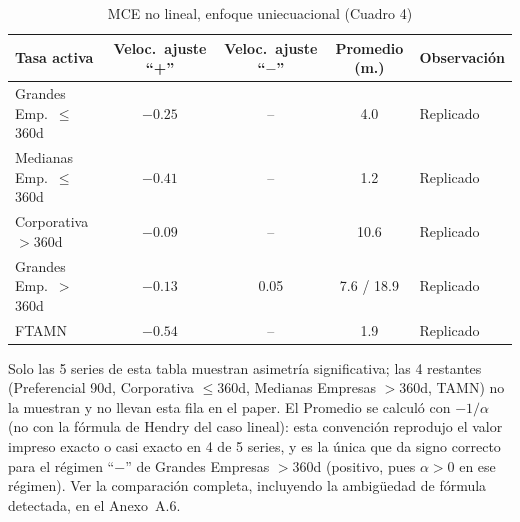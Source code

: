 \documentclass[12pt, letterpaper]{article}
\begin{document}
\begin{table}[ht]
\renewcommand{\thetable}{4'}
\begin{threeparttable}
\caption{MCE no lineal, enfoque uniecuacional (Cuadro 4)}
\label{tab:cuadro4nl}
\small
\begin{tabular}{lcccl}
\toprule
Tasa activa & Veloc.\ ajuste ``+'' & Veloc.\ ajuste ``$-$'' & Promedio (m.) & Observación\\
\midrule
Grandes Emp.\ $\le$360d   & $-0.25$ & --      & 4.0        & Replicado \\
Medianas Emp.\ $\le$360d  & $-0.41$ & --      & 1.2        & Replicado \\
Corporativa $>$360d       & $-0.09$ & --      & 10.6       & Replicado \\
Grandes Emp.\ $>$360d     & $-0.13$ & 0.05    & 7.6 / 18.9 & Replicado \\
FTAMN                     & $-0.54$ & --      & 1.9        & Replicado \\
\bottomrule
\end{tabular}
\begin{tablenotes}[flushleft]
\footnotesize\item
Solo las 5 series de esta tabla muestran asimetría significativa; las
4 restantes (Preferencial 90d, Corporativa $\le$360d, Medianas Empresas
$>$360d, TAMN) no la muestran y no llevan esta fila en el paper. El
Promedio se calculó con $-1/\alpha$ (no con la fórmula de Hendry del
caso lineal): esta convención reprodujo el valor impreso exacto o casi
exacto en 4 de 5 series, y es la única que da signo correcto para el
régimen ``$-$'' de Grandes Empresas $>$360d (positivo, pues $\alpha>0$
en ese régimen). Ver la comparación completa, incluyendo la
ambigüedad de fórmula detectada, en el Anexo~A.6.
\end{tablenotes}
\end{threeparttable}
\end{table}
\end{document}
